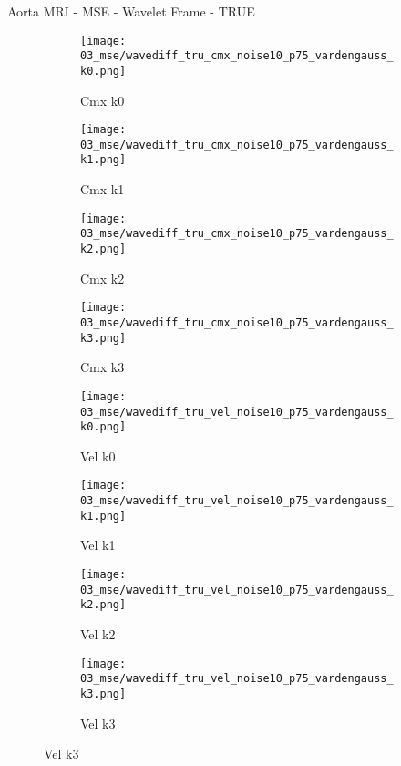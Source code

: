 \documentclass{beamer}
\begin{document}
\begin{frame}{Aorta MRI - MSE - Wavelet Frame - TRUE}{}
\begin{figure}
\begin{subfigure}{0.24\textwidth}
\texttt{[image: 03\_mse/wavediff\_tru\_cmx\_noise10\_p75\_vardengauss\_k0.png]}
\vspace{-20pt}
\caption*{\tiny Cmx k0}
\end{subfigure}
\begin{subfigure}{0.24\textwidth}
\texttt{[image: 03\_mse/wavediff\_tru\_cmx\_noise10\_p75\_vardengauss\_k1.png]}
\vspace{-20pt}
\caption*{\tiny Cmx k1}
\end{subfigure}
\begin{subfigure}{0.24\textwidth}
\texttt{[image: 03\_mse/wavediff\_tru\_cmx\_noise10\_p75\_vardengauss\_k2.png]}
\vspace{-20pt}
\caption*{\tiny Cmx k2}
\end{subfigure}
\begin{subfigure}{0.24\textwidth}
\texttt{[image: 03\_mse/wavediff\_tru\_cmx\_noise10\_p75\_vardengauss\_k3.png]}
\vspace{-20pt}
\caption*{\tiny Cmx k3}
\end{subfigure}

\begin{subfigure}{0.24\textwidth}
\texttt{[image: 03\_mse/wavediff\_tru\_vel\_noise10\_p75\_vardengauss\_k0.png]}
\vspace{-20pt}
\caption*{\tiny Vel k0}
\end{subfigure}
\begin{subfigure}{0.24\textwidth}
\texttt{[image: 03\_mse/wavediff\_tru\_vel\_noise10\_p75\_vardengauss\_k1.png]}
\vspace{-20pt}
\caption*{\tiny Vel k1}
\end{subfigure}
\begin{subfigure}{0.24\textwidth}
\texttt{[image: 03\_mse/wavediff\_tru\_vel\_noise10\_p75\_vardengauss\_k2.png]}
\vspace{-20pt}
\caption*{\tiny Vel k2}
\end{subfigure}
\begin{subfigure}{0.24\textwidth}
\texttt{[image: 03\_mse/wavediff\_tru\_vel\_noise10\_p75\_vardengauss\_k3.png]}
\vspace{-20pt}
\caption*{\tiny Vel k3}
\end{subfigure}
\end{figure}
\end{frame}
\end{document}
